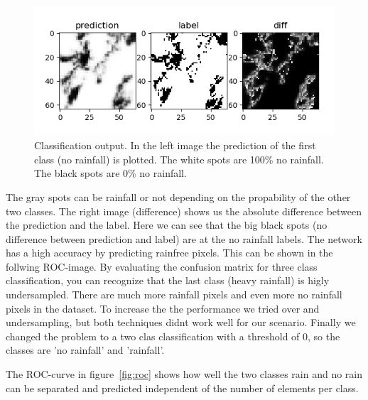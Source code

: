 \documentclass[oneside]{htwg-report}
\begin{document}
\begin{figure}[ht]
\centering
\includegraphics[width=\linewidth]{../pics/categorical_crossentropy_hidden-softmax_output-softmax_above_3072}
\caption{Classification output. In the left image the prediction of the first class (no rainfall) is plotted. The white spots are 100\% no rainfall. The black spots are 0\% no rainfall.}
\end{figure}


The gray spots can be rainfall or not depending on the propability of the other two classes. The right image (difference) shows us the absolute difference between the prediction and the label.
Here we can see that the big black spots (no difference between prediction and label) are at the no rainfall labels.
The network has a high accuracy by predicting rainfree pixels. This can be shown in the follwing ROC-image. 
By evaluating the confusion matrix for three class classification, you can recognize that the last class (heavy rainfall) is higly undersampled. 
There are much more rainfall pixels and even more no rainfall pixels in the dataset. To increase the the performance we tried over and undersampling, but both techniques didnt work well for our scenario.
Finally we changed the problem to a two clas classification with a threshold of 0, so the classes are 'no rainfall' and 'rainfall'.

The ROC-curve in figure~\ref{fig:roc} shows how well the two classes rain and no rain can be separated and predicted independent of the number of elements per class.
\end{document}
